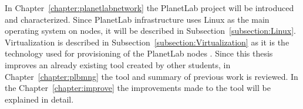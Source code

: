 In Chapter~\ref{chapter:planetlabnetwork} the PlanetLab project will be introduced and characterized. Since PlanetLab infrastructure uses Linux as the main operating system on nodes, it will be described in Subsection~\ref{subsection:Linux}. Virtualization is described in Subsection~\ref{subsection:Virtualization} as it is the technology used for provisioning of the PlanetLab nodes \cite{planetlababout}. Since this thesis improves an already existing tool created by other students, in Chapter~\ref{chapter:plbmng} the tool and summary of previous work is reviewed. In the Chapter~\ref{chapter:improve} the improvements made to the tool will be explained in detail.
